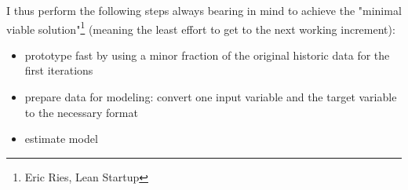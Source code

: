 \documentclass[12pt,a4paper]{article}
\begin{document}
I thus perform the following steps always bearing in mind to achieve the "minimal viable solution"\footnote{Eric Ries, Lean Startup} (meaning the least effort to get to the next working increment):

\begin{itemize}
	\item prototype fast by using a minor fraction of the original historic data for the first iterations
	\item prepare data for modeling: convert one input variable and the target variable to the necessary format
	\item estimate model 
\end{itemize}



\end{document}
